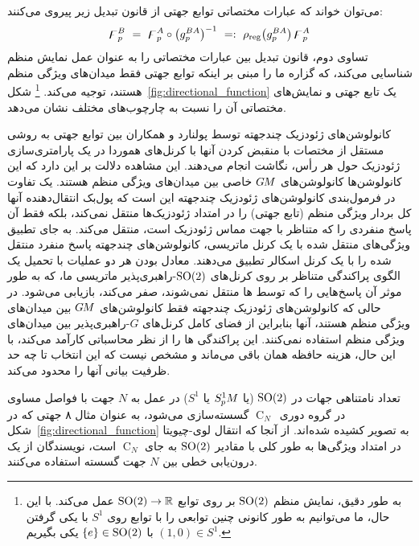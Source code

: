 می‌توان خواند که عبارات مختصاتی توابع جهتی از قانون تبدیل زیر پیروی می‌کنند:
\begin{align}
    \digamma_p^B\ =\ \digamma_p^A \circ \big(g_p^{BA}\big)^{-1}\ =:\ \rho_\textup{reg}\big( g_p^{BA}\big)\, \digamma_p^A
\end{align}
تساوی دوم، قانون تبدیل بین عبارات مختصاتی را به عنوان عمل نمایش منظم شناسایی می‌کند، که گزاره ما را مبنی بر اینکه توابع جهتی فقط میدان‌های ویژگی منظم هستند، توجیه می‌کند.%
\footnote{
    به طور دقیق، نمایش منظم $\operatorname{SO}(2)$ بر روی توابع $\operatorname{SO}(2) \to \mathbb{R}$ عمل می‌کند.
    با این حال، ما می‌توانیم به طور کانونی چنین توابعی را با توابع روی $S^1$ با یکی گرفتن $(1,0)\in S^1$ با $\{e\}\in\operatorname{SO}(2)$ یکی بگیریم.
}
شکل~\ref{fig:directional_function} یک تابع جهتی و نمایش‌های مختصاتی آن را نسبت به چارچوب‌های مختلف نشان می‌دهد.

کانولوشن‌های ژئودزیک چندجهته توسط پولنارد و همکاران\cite{poulenard2018multi} بین توابع جهتی به روشی مستقل از مختصات با منقبض کردن آنها با کرنل‌های هموردا در یک پارامتری‌سازی ژئودزیک حول هر رأس، نگاشت انجام می‌دهند.
این مشاهده دلالت بر این دارد که این کانولوشن‌ها کانولوشن‌های $G\mkern-1.4muM$ خاصی بین میدان‌های ویژگی منظم هستند.
یک تفاوت در فرمول‌بندی کانولوشن‌های ژئودزیک چندجهته این است که پول‌بک انتقال‌دهنده آنها کل بردار ویژگی منظم (تابع جهتی) را در امتداد ژئودزیک‌ها منتقل نمی‌کند، بلکه فقط آن پاسخ منفردی را که متناظر با جهت مماس ژئودزیک است، منتقل می‌کند.
به جای تطبیق ویژگی‌های منتقل شده با یک کرنل ماتریسی، کانولوشن‌های چندجهته پاسخ منفرد منتقل شده را با یک کرنل اسکالر تطبیق می‌دهند.
معادل بودن هر دو عملیات با تحمیل یک الگوی پراکندگی متناظر بر روی کرنل‌های $\operatorname{SO}(2)$-راهبری‌پذیر ماتریسی ما، که به طور موثر آن پاسخ‌هایی را که توسط ها منتقل نمی‌شوند، صفر می‌کند، بازیابی می‌شود.
در حالی که کانولوشن‌های ژئودزیک چندجهته فقط کانولوشن‌های $G\mkern-1.4muM$ بین میدان‌های ویژگی منظم هستند، آنها بنابراین از فضای کامل کرنل‌های $G$-راهبری‌پذیر بین میدان‌های ویژگی منظم استفاده نمی‌کنند.
این پراکندگی ها را از نظر محاسباتی کارآمد می‌کند، با این حال، هزینه حافظه همان باقی می‌ماند و مشخص نیست که این انتخاب تا چه حد ظرفیت بیانی آنها را محدود می‌کند.

تعداد نامتناهی جهات در $\operatorname{SO}(2)$ (یا $S^1_{\mkern-.5mu p}\mkern-.5muM$ یا $S^1$) در عمل به $N$ جهت با فواصل مساوی در گروه دوری~$\operatorname{C}_N$ گسسته‌سازی می‌شود، به عنوان مثال ۸ جهتی که در شکل~\ref{fig:directional_function} به تصویر کشیده شده‌اند.
از آنجا که انتقال لوی-چیویتا در امتداد ویژگی‌ها به طور کلی با مقادیر $\operatorname{SO}(2)$ به جای $\operatorname{C}_N$ است، نویسندگان از یک درون‌یابی خطی بین $N$ جهت گسسته استفاده می‌کنند.

